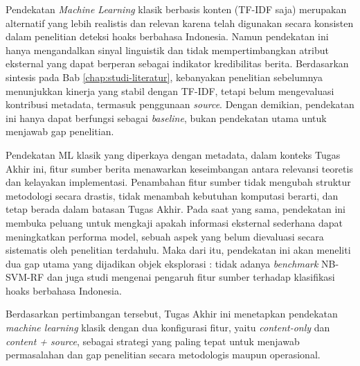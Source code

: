 Pendekatan \textit{Machine Learning} klasik berbasis konten (TF-IDF saja) merupakan alternatif yang lebih realistis dan relevan karena telah digunakan secara konsisten dalam penelitian deteksi hoaks berbahasa Indonesia. Namun pendekatan ini hanya mengandalkan sinyal linguistik dan tidak mempertimbangkan atribut eksternal yang dapat berperan sebagai indikator kredibilitas berita. Berdasarkan sintesis pada Bab \ref{chap:studi-literatur}, kebanyakan penelitian sebelumnya menunjukkan kinerja yang stabil dengan TF-IDF, tetapi belum mengevaluasi kontribusi metadata, termasuk penggunaan \textit{source}. Dengan demikian, pendekatan ini hanya dapat berfungsi sebagai \textit{baseline}, bukan pendekatan utama untuk menjawab gap penelitian.

Pendekatan ML klasik yang diperkaya dengan metadata, dalam konteks Tugas Akhir ini, fitur sumber berita menawarkan keseimbangan antara relevansi teoretis dan kelayakan implementasi. Penambahan fitur sumber tidak mengubah struktur metodologi secara drastis, tidak menambah kebutuhan komputasi berarti, dan tetap berada dalam batasan Tugas Akhir. Pada saat yang sama, pendekatan ini membuka peluang untuk mengkaji apakah informasi eksternal sederhana dapat meningkatkan performa model, sebuah aspek yang belum dievaluasi secara sistematis oleh penelitian terdahulu. Maka dari itu, pendekatan ini akan meneliti dua gap utama yang dijadikan objek eksplorasi : tidak adanya \textit{benchmark} NB-SVM-RF dan juga studi mengenai pengaruh fitur sumber terhadap klasifikasi hoaks berbahasa Indonesia.

Berdasarkan pertimbangan tersebut, Tugas Akhir ini menetapkan pendekatan \textit{machine learning} klasik dengan dua konfigurasi fitur, yaitu \textit{content-only} dan \textit{content + source}, sebagai strategi yang paling tepat untuk menjawab permasalahan dan gap penelitian secara metodologis maupun operasional.
